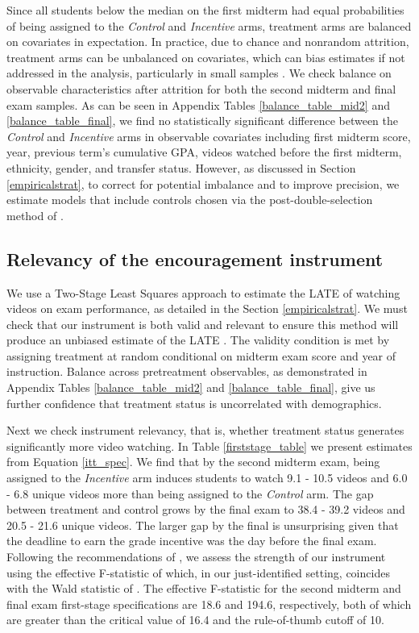 \documentclass[12pt]{article}
\begin{document}
Since all students below the median on the first midterm had equal probabilities of being assigned to the \textit{Control} and \textit{Incentive} arms, treatment arms are balanced on covariates in expectation. In practice, due to chance and nonrandom attrition, treatment arms can be unbalanced on covariates, which can bias estimates if not addressed in the analysis, particularly in small samples \parencite{ai2017}. We check balance on observable characteristics after attrition for both the second midterm and final exam samples. As can be seen in Appendix Tables \ref{balance_table_mid2} and \ref{balance_table_final}, we find no statistically significant difference between the \textit{Control} and \textit{Incentive} arms in observable covariates including first midterm score, year, previous term's cumulative GPA, videos watched before the first midterm, ethnicity, gender, and transfer status. However, as discussed in Section \ref{empiricalstrat}, to correct for potential imbalance and to improve precision, we estimate models that include controls chosen via the post-double-selection method of \textcite{bch2014a}.

\subsection{Relevancy of the encouragement instrument}

We use a Two-Stage Least Squares approach to estimate the LATE of watching videos on exam performance, as detailed in the Section \ref{empiricalstrat}. We must check that our instrument is both valid and relevant to ensure this method will produce an unbiased estimate of the LATE \parencite{ir2015}. The validity condition is met by assigning treatment at random conditional on midterm exam score and year of instruction. Balance across pretreatment observables, as demonstrated in Appendix Tables \ref{balance_table_mid2} and \ref{balance_table_final}, give us further confidence that treatment status is uncorrelated with demographics.

Next we check instrument relevancy, that is, whether treatment status generates significantly more video watching. In Table \ref{firststage_table} we present estimates from Equation \ref{itt_spec}. We find that by the second midterm exam, being assigned to the \textit{Incentive} arm induces students to watch 9.1 - 10.5 videos and 6.0 - 6.8 unique videos more than being assigned to the \textit{Control} arm. The gap between treatment and control grows by the final exam to 38.4 - 39.2 videos and 20.5 - 21.6 unique videos. The larger gap by the final is unsurprising given that the deadline to earn the grade incentive was the day before the final exam. Following the recommendations of \textcite{ass2019}, we assess the strength of our instrument using the effective F-statistic of \textcite{op2013} which, in our just-identified setting, coincides with the Wald statistic of \textcite{kp2006}. The effective F-statistic for the second midterm and final exam first-stage specifications are 18.6 and 194.6, respectively, both of which are greater than the \textcite{sy2005} critical value of 16.4 and the rule-of-thumb cutoff of 10.
\end{document}
